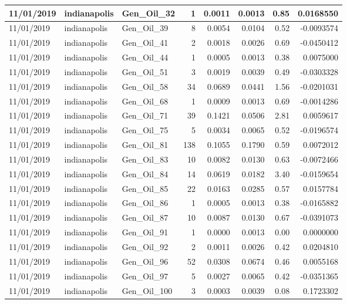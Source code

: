 \documentclass[
  letterpaper,
  DIV=11,
  numbers=noendperiod]{scrartcl}
\begin{document}
\begin{tabular}{l|l|l|r|r|r|r|r}
\hline
11/01/2019 & indianapolis & Gen\_Oil\_32 & 1 & 0.0011 & 0.0013 & 0.85 & 0.0168550\\
\hline
11/01/2019 & indianapolis & Gen\_Oil\_39 & 8 & 0.0054 & 0.0104 & 0.52 & -0.0093574\\
\hline
11/01/2019 & indianapolis & Gen\_Oil\_41 & 2 & 0.0018 & 0.0026 & 0.69 & -0.0450412\\
\hline
11/01/2019 & indianapolis & Gen\_Oil\_44 & 1 & 0.0005 & 0.0013 & 0.38 & 0.0075000\\
\hline
11/01/2019 & indianapolis & Gen\_Oil\_51 & 3 & 0.0019 & 0.0039 & 0.49 & -0.0303328\\
\hline
11/01/2019 & indianapolis & Gen\_Oil\_58 & 34 & 0.0689 & 0.0441 & 1.56 & -0.0201031\\
\hline
11/01/2019 & indianapolis & Gen\_Oil\_68 & 1 & 0.0009 & 0.0013 & 0.69 & -0.0014286\\
\hline
11/01/2019 & indianapolis & Gen\_Oil\_71 & 39 & 0.1421 & 0.0506 & 2.81 & 0.0059617\\
\hline
11/01/2019 & indianapolis & Gen\_Oil\_75 & 5 & 0.0034 & 0.0065 & 0.52 & -0.0196574\\
\hline
11/01/2019 & indianapolis & Gen\_Oil\_81 & 138 & 0.1055 & 0.1790 & 0.59 & 0.0072012\\
\hline
11/01/2019 & indianapolis & Gen\_Oil\_83 & 10 & 0.0082 & 0.0130 & 0.63 & -0.0072466\\
\hline
11/01/2019 & indianapolis & Gen\_Oil\_84 & 14 & 0.0619 & 0.0182 & 3.40 & -0.0159654\\
\hline
11/01/2019 & indianapolis & Gen\_Oil\_85 & 22 & 0.0163 & 0.0285 & 0.57 & 0.0157784\\
\hline
11/01/2019 & indianapolis & Gen\_Oil\_86 & 1 & 0.0005 & 0.0013 & 0.38 & -0.0165882\\
\hline
11/01/2019 & indianapolis & Gen\_Oil\_87 & 10 & 0.0087 & 0.0130 & 0.67 & -0.0391073\\
\hline
11/01/2019 & indianapolis & Gen\_Oil\_91 & 1 & 0.0000 & 0.0013 & 0.00 & 0.0000000\\
\hline
11/01/2019 & indianapolis & Gen\_Oil\_92 & 2 & 0.0011 & 0.0026 & 0.42 & 0.0204810\\
\hline
11/01/2019 & indianapolis & Gen\_Oil\_96 & 52 & 0.0308 & 0.0674 & 0.46 & 0.0055168\\
\hline
11/01/2019 & indianapolis & Gen\_Oil\_97 & 5 & 0.0027 & 0.0065 & 0.42 & -0.0351365\\
\hline
11/01/2019 & indianapolis & Gen\_Oil\_100 & 3 & 0.0003 & 0.0039 & 0.08 & 0.1723302\\

\end{tabular}
\end{document}
